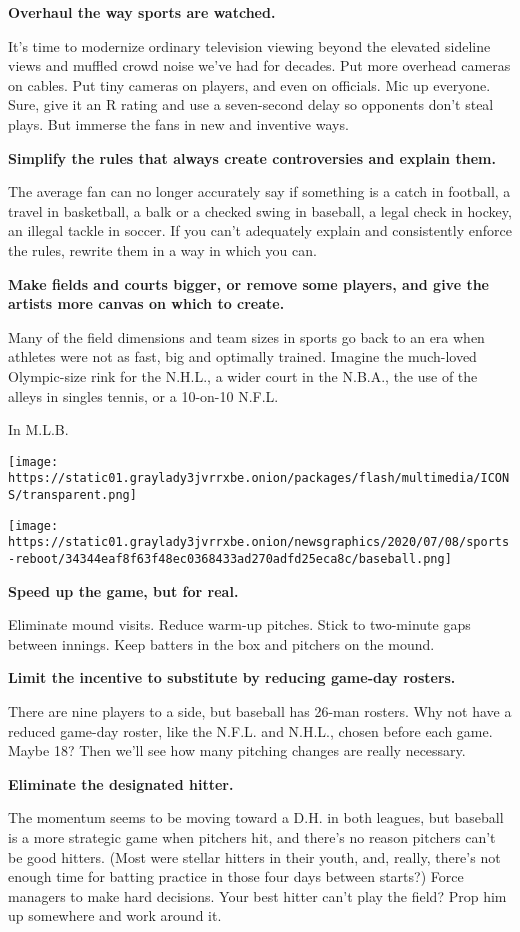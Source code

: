 \textbf{Overhaul the way sports are watched.}

It's time to modernize ordinary television viewing beyond the elevated
sideline views and muffled crowd noise we've had for decades. Put more
overhead cameras on cables. Put tiny cameras on players, and even on
officials. Mic up everyone. Sure, give it an R rating and use a
seven-second delay so opponents don't steal plays. But immerse the fans
in new and inventive ways.

\textbf{Simplify the rules that always create controversies and explain
them.}

The average fan can no longer accurately say if something is a catch in
football, a travel in basketball, a balk or a checked swing in baseball,
a legal check in hockey, an illegal tackle in soccer. If you can't
adequately explain and consistently enforce the rules, rewrite them in a
way in which you can.

\textbf{Make fields and courts bigger, or remove some players, and give
the artists more canvas on which to create.}

Many of the field dimensions and team sizes in sports go back to an era
when athletes were not as fast, big and optimally trained. Imagine the
much-loved Olympic-size rink for the N.H.L., a wider court in the
N.B.A., the use of the alleys in singles tennis, or a 10-on-10 N.F.L.

In M.L.B.

\texttt{[image: https://static01.graylady3jvrrxbe.onion/packages/flash/multimedia/ICONS/transparent.png]}

\texttt{[image: https://static01.graylady3jvrrxbe.onion/newsgraphics/2020/07/08/sports-reboot/34344eaf8f63f48ec0368433ad270adfd25eca8c/baseball.png]}

\textbf{Speed up the game, but for real.}

Eliminate mound visits. Reduce warm-up pitches. Stick to two-minute gaps
between innings. Keep batters in the box and pitchers on the mound.

\textbf{Limit the incentive to substitute by reducing game-day rosters.}

There are nine players to a side, but baseball has 26-man rosters. Why
not have a reduced game-day roster, like the N.F.L. and N.H.L., chosen
before each game. Maybe 18? Then we'll see how many pitching changes are
really necessary.

\textbf{Eliminate the designated hitter.}

The momentum seems to be moving toward a D.H. in both leagues, but
baseball is a more strategic game when pitchers hit, and there's no
reason pitchers can't be good hitters. (Most were stellar hitters in
their youth, and, really, there's not enough time for batting practice
in those four days between starts?) Force managers to make hard
decisions. Your best hitter can't play the field? Prop him up somewhere
and work around it.


